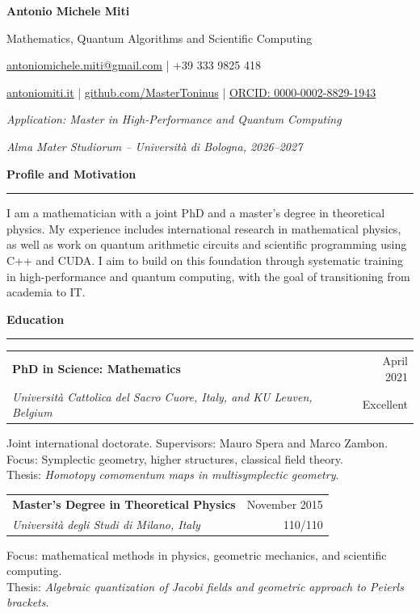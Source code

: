 \documentclass[10pt,a4paper]{article}
\makeatletter
\newcommand{\cvsection}[1]{%
    \Needspace{4\baselineskip}%
    \vspace{0.8em}%
    {\large\bfseries\color{accent} #1}\par
    \vspace{0.2em}\hrule\vspace{0.45em}%
}
\newcommand{\education}[5]{%
    \Needspace{5\baselineskip}%
    \begin{tabularx}{\textwidth}{@{}>{\raggedright\arraybackslash}Xr@{}}
        \textbf{#1} & #2 \\
        \textit{#4} & #3
    \end{tabularx}\par
    #5\par\vspace{0.45em}%
}
\makeatother
\begin{document}
    {\Huge\bfseries Antonio Michele Miti}\par
    \vspace{0.25em}
    {\large\color{accent} Mathematics, Quantum Algorithms and Scientific Computing}\par
    \vspace{0.4em}
    \href{mailto:antoniomichele.miti@gmail.com}{antoniomichele.miti@gmail.com}
    \enspace | \enspace +39 333 9825 418\par
    \href{https://www.antoniomiti.it/}{antoniomiti.it}
    \enspace | \enspace
    \href{https://github.com/MasterToninus}{github.com/MasterToninus}
    \enspace | \enspace
    \href{https://orcid.org/0000-0002-8829-1943}{ORCID: 0000-0002-8829-1943}\par
    \vspace{0.4em}
    \textit{Application: Master in High-Performance and Quantum Computing}\par
    \textit{Alma Mater Studiorum -- Universit\`a di Bologna, 2026--2027}

    \cvsection{Profile and Motivation}

    I am a mathematician with a joint PhD and a master's degree in theoretical physics.
My experience includes international research in mathematical physics, as well as work on
quantum arithmetic circuits and scientific programming using C++ and CUDA.
I aim to build on this foundation through systematic training in
high-performance and quantum computing, with the goal of transitioning from academia to IT.

    \cvsection{Education}

    \education{PhD in Science: Mathematics}{April 2021}{Excellent}
        {Universit\`a Cattolica del Sacro Cuore, Italy, and KU Leuven, Belgium}
        {Joint international doctorate. Supervisors: Mauro Spera and Marco Zambon.
        \\Focus: Symplectic geometry, higher structures, classical field theory.
        \\Thesis: \emph{Homotopy comomentum maps
        in multisymplectic geometry}. }

    \education{Master's Degree in Theoretical Physics}{November 2015}{110/110}
        {Universit\`a degli Studi di Milano, Italy}
        {Focus: mathematical methods in physics, geometric mechanics, and scientific computing.
        \\
        Thesis: \emph{Algebraic quantization of Jacobi fields and geometric
        approach to Peierls brackets}.}
\end{document}
